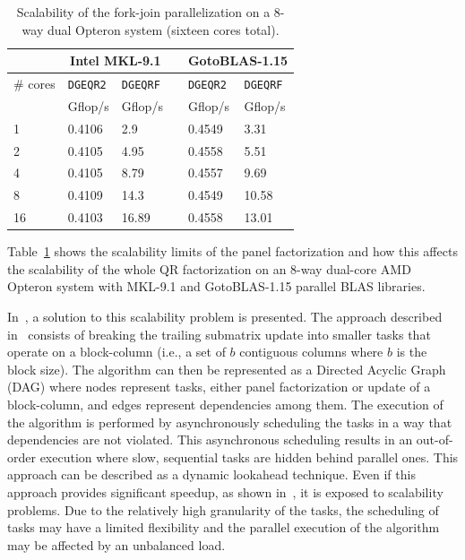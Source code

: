 \documentclass[runningheads]{llncs}
\begin{document}
\begin{table}[!h]
  \centering
  \begin{tabular}[!h]{p{0.5in}p{0.5in}p{0.5in}p{0.3in}p{0.5in}p{0.5in}}
        \hline
        & \multicolumn{2}{c}{Intel MKL-9.1}  &  & \multicolumn{2}{c}{GotoBLAS-1.15}\\
        \hline
     \# cores   &  \texttt{DGEQR2} & \texttt{DGEQRF} &  & \texttt{DGEQR2} & \texttt{DGEQRF}\\
        &  Gflop/s         &   Gflop/s       &  & Gflop/s         & Gflop/s        \\
        \hline
        \hline
      1 &  0.4106          &  2.9            &  &  0.4549        &  3.31       \\
      2 &  0.4105          &  4.95           &  &  0.4558        &  5.51       \\
      4 &  0.4105          &  8.79           &  &  0.4557        &  9.69       \\
      8 &  0.4109          &  14.3           &  &  0.4549        &  10.58       \\
     16 &  0.4103          &  16.89          &  &  0.4558        &  13.01       \\
        \hline
  \end{tabular}
  \caption{\label{tab:blas2}Scalability of the fork-join
    parallelization on a 8-way dual Opteron system (sixteen cores
    total).}
\end{table}

Table~\ref{tab:blas2} shows the scalability limits of the panel
factorization and how this affects the scalability of the whole QR
factorization on an 8-way dual-core AMD Opteron system with MKL-9.1 and GotoBLAS-1.15
parallel BLAS libraries.

In~\cite{Kurzak:2006:ILA,para06}, a solution to this scalability
problem is presented. The approach described in~\cite{Kurzak:2006:ILA,para06} consists of
breaking the trailing submatrix update into smaller tasks that operate
on a block-column (i.e., a set of $b$ contiguous columns where $b$ is
the block size). The algorithm can then be represented as a Directed
Acyclic Graph (DAG) where nodes represent tasks, either panel factorization
or update of a block-column, and edges represent dependencies among
them. The execution of the algorithm is performed by asynchronously
scheduling the tasks in a way that dependencies are not violated. This
asynchronous scheduling results in an out-of-order execution where
slow, sequential tasks are hidden behind parallel ones. This approach
can be described as a dynamic lookahead technique.
Even if this approach provides significant speedup, as shown
in~\cite{Kurzak:2006:ILA}, it is exposed to scalability problems. Due
to the relatively high granularity of the tasks, the scheduling of
tasks may have a limited flexibility and the parallel execution of the
algorithm may be affected by an unbalanced load.
\end{document}
